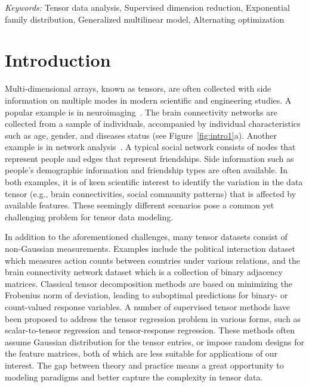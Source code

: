 \documentclass[12pt]{article}
\theoremstyle{definition}
\theoremstyle{definition}
\begin{document}
\noindent%
{\it Keywords:}  Tensor data analysis, Supervised dimension reduction, Exponential family distribution, Generalized multilinear model, Alternating optimization
\vfill

\newpage
{} %
\section{Introduction}
\label{sec:intro}

Multi-dimensional arrays, known as tensors, are often collected with side information on multiple modes in modern scientific and engineering studies. A popular example is in neuroimaging~\citep{zhou2013tensor}. The brain connectivity networks are collected from a sample of individuals, accompanied by individual characteristics such as age, gender, and diseases status (see Figure~\ref{fig:intro1}a). Another example is in network analysis~\citep{pmlr-v108-berthet20a,hoff2005bilinear}. A typical social network consists of nodes that represent people and edges that represent  friendships. Side information such as people’s demographic information and friendship types are often available. In both examples, it is of keen scientific interest to identify the variation in the data tensor (e.g., brain connectivities, social community patterns) that is affected by available features. These seemingly different scenarios pose a common yet challenging problem for tensor data modeling. 

In addition to the aforementioned challenges, many tensor datasets consist of non-Gaussian measurements. Examples include the political interaction dataset \citep{nickel2011three,hu2015scalable} which measures action counts between countries under various relations, and the brain connectivity network dataset \citep{zhang2018mapping,wang2018learning,wang2019common} which is a collection of binary adjacency matrices. Classical tensor decomposition methods are based on minimizing the Frobenius norm of deviation, leading to suboptimal predictions for binary- or count-valued response variables. A number of supervised tensor methods have been proposed \citep{narita2012tensor, lock2018supervised,rai2014scalable} to address the tensor regression problem in various forms, such as scalar-to-tensor regression and tensor-response regression. These methods often assume Gaussian distribution for the tensor entries, or impose random designs for the feature matrices, both of which are less suitable for applications of our interest. The gap between theory and practice means a great opportunity to modeling paradigms and better capture the complexity in tensor data. 
\end{document}
